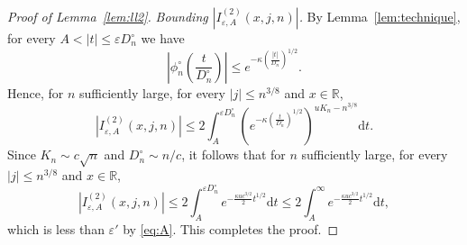 \documentclass[11pt]{article}
\theoremstyle{definition}
\numberwithin{equation}{section}
\numberwithin{figure}{section}
\numberwithin{table}{section}
\newcommand{\R}{\mathbb{R}}
\def\phicn{\phi^{\circ}_{n}}
\def\Dcn{D^{\circ}_{n}}
\renewcommand{\epsilon}{\varepsilon}
\begin{document}
\begin{proof}[Proof of Lemma~\ref{lem:ll2}]
 \emph{Bounding $|I^{(2)}_{\epsilon, {A} }(x,j,n)|$.}  By Lemma~\ref{lem:technique}, for every $A<|t| \leq \epsilon \Dcn$ we have \[  \left| \phicn \left(  \frac{t}{\Dcn} \right) \right|  \leq e^{-\kappa \left(  \frac{|t|}{\Dcn} \right) ^{1/2}}.\]
Hence, for $n$ sufficiently large, for every $|j| \leq n^{3/8}$ and $x \in \R$,
 \[ \left| I^{(2)}_{\epsilon,A}(x,j,n)  \right| \leq 2 \int_{A}^{\epsilon \Dcn}\left( e^{-\kappa  \left(  \frac{t}{\Dcn} \right) ^{1/2}} \right) ^{ uK_{n}  -n^{3/8}} \mathrm{d}t .\]
 Since $K_{n} \sim c \sqrt{n}$ and $ \Dcn\sim  n /c$, it follows that for $n$ sufficiently large, for every $|j| \leq n^{3/8}$ and $x \in \R$,
  \[ \left| I^{(2)}_{\epsilon,A}(x,j,n) \right| \leq 2 \int_{A}^{\epsilon \Dcn}  e^{- \frac{\kappa u  c^{3/2}}{2} t^{1/2}} \mathrm{d}t  \leq 2 \int_{A}^{\infty} e^{- \frac{\kappa u c^{3/2}}{2} t^{1/2}} \mathrm{d}t,\]
  which is less than $\epsilon'$ by \eqref{eq:A}.   This completes the proof.
  \end{proof}
\end{document}
